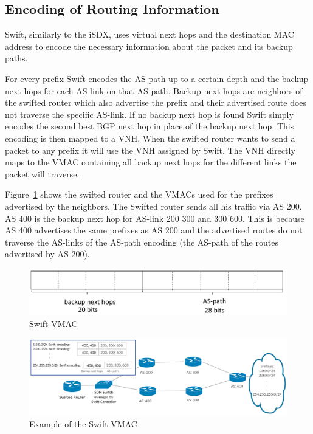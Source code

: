 \newpage

\subsection{\label{chapter2:Swift:encoding_of_routing_information}Encoding of Routing Information}
Swift, similarly to the iSDX, uses virtual next hops and the destination MAC address to encode the necessary information about the packet and its backup paths.

For every prefix Swift encodes the AS-path up to a certain depth and the backup next hops for each AS-link on that AS-path. Backup next hops are neighbors of the swifted router which also advertise the prefix and their advertised route does not traverse the specific AS-link. If no backup next hop is found Swift simply encodes the second best BGP next hop in place of the backup next hop. This encoding is then mapped to a VNH. When the swifted router wants to send a packet to any prefix it will use the VNH assigned by Swift. The VNH directly maps to the VMAC containing all backup next hops for the different links the packet will traverse. 

Figure~\ref{fig:swift_vmac} shows the swifted router and the VMACs used for the prefixes advertised by the neighbors. The Swifted router sends all his traffic via AS 200. AS 400 is the backup next hop for AS-link 200 300 and 300 600. This is because AS 400 advertises the same prefixes as AS 200 and the advertised routes do not traverse the AS-links of the AS-path encoding (the AS-path of the routes advertised by AS 200).

\begin{figure}[h]
\center
\includegraphics[scale = 0.6]{Figures/swift_vmac3_cropped.pdf}
\caption{Swift VMAC}
\end{figure}


\begin{figure}[h]
\center
\includegraphics[scale = 0.24]{Figures/bckgrnd_swift_topology.pdf}
\caption{Example of the Swift VMAC}
\label{fig:swift_vmac}
\end{figure}

